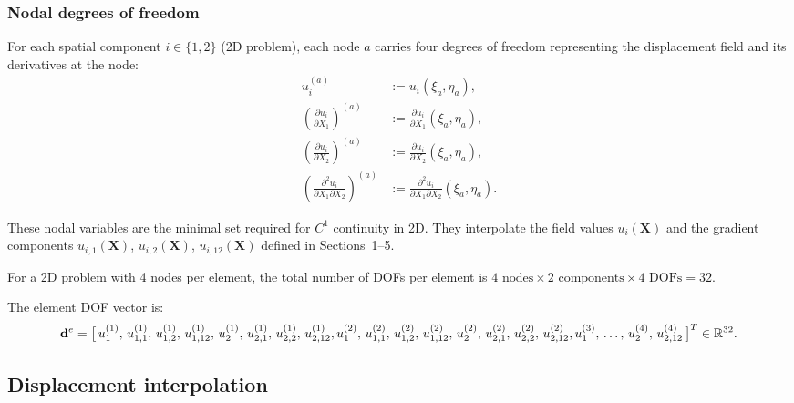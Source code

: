 \documentclass[11pt]{article}
\begin{document}
\subsubsection{Nodal degrees of freedom}

For each spatial component $i\in\{1,2\}$ (2D problem), each node $a$
carries four degrees of freedom representing the displacement field and
its derivatives at the node:
\begin{align}
u_{i}^{(a)} &:= u_{i}(\xi_{a},\eta_{a}),
\label{s6:DOF1}\\
\left(\frac{\partial u_{i}}{\partial X_{1}}\right)^{(a)} &:= \frac{\partial u_{i}}{\partial X_{1}}(\xi_{a},\eta_{a}),
\label{s6:DOF2}\\
\left(\frac{\partial u_{i}}{\partial X_{2}}\right)^{(a)} &:= \frac{\partial u_{i}}{\partial X_{2}}(\xi_{a},\eta_{a}),
\label{s6:DOF3}\\
\left(\frac{\partial^{2}u_{i}}{\partial X_{1}\partial X_{2}}\right)^{(a)} &:= \frac{\partial^{2}u_{i}}{\partial X_{1}\partial X_{2}}(\xi_{a},\eta_{a}).
\label{s6:DOF4}
\end{align}

These nodal variables are the minimal set required for $C^{1}$ continuity
in 2D. They interpolate the field values $u_{i}(\mathbf{X})$ and the
gradient components $u_{i,1}(\mathbf{X})$, $u_{i,2}(\mathbf{X})$,
$u_{i,12}(\mathbf{X})$ defined in Sections~1--5.

For a 2D problem with 4 nodes per element, the total number of DOFs per
element is $4\text{ nodes}\times 2\text{ components}\times 4\text{ DOFs}=32$.

The element DOF vector is:
\begin{equation}
\mathbf{d}^{e}
= \bigl[\,
   u_{1}^{(1)},\,u_{1,1}^{(1)},\,u_{1,2}^{(1)},\,u_{1,12}^{(1)},
   \,u_{2}^{(1)},\,u_{2,1}^{(1)},\,u_{2,2}^{(1)},\,u_{2,12}^{(1)},
\nonumber\\
   u_{1}^{(2)},\,u_{1,1}^{(2)},\,u_{1,2}^{(2)},\,u_{1,12}^{(2)},
   \,u_{2}^{(2)},\,u_{2,1}^{(2)},\,u_{2,2}^{(2)},\,u_{2,12}^{(2)},
\nonumber\\
   u_{1}^{(3)},\,\ldots,\,u_{2}^{(4)},\,u_{2,12}^{(4)}
\,\bigr]^{T}
\in\mathbb{R}^{32}.
\label{s6:d_elem}
\end{equation}

\subsection{Displacement interpolation}
\label{ssec:disp_interp}
\end{document}
